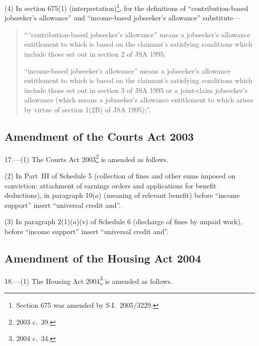 \documentclass[12pt,a4paper]{article}
\begin{document}
(4) In section 675(1) (interpretation)\footnote{Section 675 was amended by S.I.~2005/3229.}, for the definitions of “contribution-based jobseeker’s allowance” and “income-based jobseeker’s allowance” substitute—
\begin{quotation}
\begin{sloppypar}
““contribution-based jobseeker’s allowance” means a jobseeker’s allowance entitlement to which is based on the claimant’s satisfying conditions which include those set out in section 2 of JSA 1995;
\end{sloppypar}

“income-based jobseeker’s allowance” means a jobseeker’s allowance entitlement to which is based on the claimant’s satisfying conditions which include those set out in section 3 of JSA 1995 or a joint-claim jobseeker’s allowance (which means a jobseeker’s allowance entitlement to which arises by virtue of section 1(2B) of JSA 1995);”.
\end{quotation}

\subsection[17. Amendment of the Courts Act 2003]{Amendment of the Courts Act 2003}

17.—(1) The Courts Act 2003\footnote{2003 c.~39.} is amended as follows.

(2) In Part~III of Schedule 5 (collection of fines and other sums imposed on conviction: attachment of earnings orders and applications for benefit deductions), in paragraph 10($a$)  (meaning of relevant benefit) before “income support” insert “universal credit and”.

(3) In paragraph 2(1)($a$)(v)  of Schedule 6 (discharge of fines by unpaid work), before “income support” insert “universal credit and”.

\subsection[18. Amendment of the Housing Act 2004]{Amendment of the Housing Act 2004}

18.—(1) The Housing Act 2004\footnote{2004 c.~34.} is amended as follows.
\end{document}
